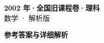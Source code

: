 \documentclass[zihao=-4, a4paper]{ctexart}
\begin{document}
\begin{center}
  {\Large\bfseries 2002 年·全国旧课程卷·理科}\\[4pt]
  {\large 数学 · 解析版}
\end{center}
\medskip
{}

\clearpage
{}
\begin{center}{\Large\bfseries 参考答案与详细解析}\end{center}
\medskip

\end{document}
